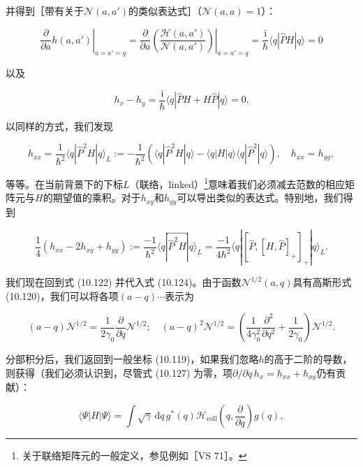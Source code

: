 并得到［带有关于$\mathscr{N}(a,a')$的类似表达式］（$\mathscr{N}(a,a)=1$）：

\begin{equation}
\left.\frac{\partial}{\partial a}h(a,a')\right|_{a=a'=q}=\left.\frac{\partial}{\partial a}\left(\frac{\mathscr{H}(a,a')}{\mathscr{N}(a,a')}\right)\right|_{a=a'=q}=\frac{\mathrm{i}}{\hbar}\langle q|\hat{P}H|q\rangle=0\label{eq:10.127}
\end{equation}

以及

\[
h_{x}-h_{y}=\frac{\mathrm{i}}{\hbar}\langle q|\hat{P}H+H\hat{P}|q\rangle=0.
\]

以同样的方式，我们发现

\begin{equation}
h_{xx}=\frac{1}{\hbar^{2}}\langle q|\hat{P}^{2}H|q\rangle_{L}:=-\frac{1}{\hbar^{2}}\left(\langle q|\hat{P}^{2}H|q\rangle-\langle q|H|q\rangle\langle q|\hat{P}^{2}|q\rangle\right),\quad h_{xx}=h_{yy},\label{eq:10.128}
\end{equation}

等等。在当前背景下的下标$L$（联络，linked）\footnote{关于联络矩阵元的一般定义，参见例如［VS 71］。}意味着我们必须减去范数的相应矩阵元与$H$的期望值的乘积。对于$h_{xy}$和$h_{yy}$可以导出类似的表达式。特别地，我们得到

\begin{equation}
\frac{1}{4}(h_{xx}-2h_{xy}+h_{yy}):=\frac{-1}{\hbar^{2}}\langle q|\overbracket{\hat{P}^{2}H}|q\rangle_{L}=\frac{-1}{4\hbar^{2}}\langle q|[\hat{P},[H,\hat{P}]_{+}]_{+}|q\rangle_{L}.\label{eq:10.129}
\end{equation}

我们现在回到式 (10.122) 并代入式 (10.124)。由于函数$\mathscr{N}^{1/2}(a,q)$具有高斯形式
(10.120)，我们可以将各项$(a-q)\cdots$表示为

\begin{equation}
(a-q)\mathscr{N}^{1/2}=\frac{1}{2\gamma_{0}}\frac{\partial}{\partial q}\mathscr{N}^{1/2};\quad(a-q)^{2}\mathscr{N}^{1/2}=\left(\frac{1}{4\gamma^{2}_{0}}\frac{\partial^{2}}{\partial q^{2}}+\frac{1}{2\gamma_{0}}\right)\mathscr{N}^{1/2}.\label{eq:10.130}
\end{equation}

分部积分后，我们返回到一般坐标 (10.119)，如果我们忽略$h$的高于二阶的导数，则获得（我们必须认识到，尽管式 (10.127)
为零，项$\partial/\partial q\,h_{x}=h_{xx}+h_{xy}$仍有贡献）：

\begin{equation}
\langle\Psi|H|\Psi\rangle=\int\sqrt{\gamma}\,\mathrm{d}q\,g^{*}(q)\mathscr{H}_{\mathrm{coll}}\left(q,\frac{\partial}{\partial q}\right)g(q),\label{eq:10.131}
\end{equation}

